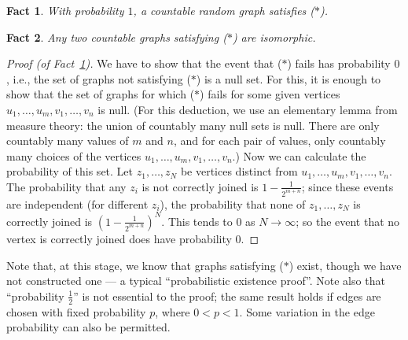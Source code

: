 \documentclass[12pt]{article}
\newtheorem{fact}{Fact}
\begin{document}
\begin{fact}\label{ch32:subsec2.1.1}
With probability $1$, a countable random graph satisfies ($\ast$).
\end{fact}

\begin{fact}\label{ch32:subsec2.1.2} 
Any two countable graphs satisfying ($\ast$) are isomorphic.
\end{fact}

\begin{proof}[Proof (of Fact~\ref{ch32:subsec2.1.1})]
We have to show
that the event that ($\ast$) fails has probability $0$, i.e., the set
of graphs not satisfying ($\ast$) is a null set. For this, it is
enough to show that the set of graphs for which ($\ast$) fails for
some given vertices $u_1, \ldots, u_m, v_1, \ldots, v_n$ is null.
(For this deduction, we use an elementary lemma from measure theory:
the union of countably many null sets is null. There are only
countably many values of $m$ and $n$, and for each pair of values,
only countably many choices of the vertices $u_1, \ldots, u_m, v_1,
\ldots, v_n$.) Now we can calculate the probability of this set.
Let $z_1,\ldots,z_N$ be vertices distinct from $u_1, \ldots, u_m,
v_1, \ldots, v_n$. The probability that any $z_i$ is not correctly
joined is $1- \frac{1}{2^{m+n}}$; since these events are independent
(for different $z_i$), the probability that none of $z_1,\ldots,z_N$
is correctly joined is $(1 - \frac{1}{2^{m+n}})^N$. This tends to $0$
as $N \rightarrow \infty$; so the event that no vertex is correctly
joined does have probability $0$.
\end{proof}

Note that, at this stage, we know that graphs satisfying ($\ast$)
exist, though we have not constructed one --- a typical
``probabilistic existence proof''. Note also that ``probability
$\frac{1}{2}$'' is not essential to the proof; the same result holds
if edges are chosen with fixed probability $p$, where $0 < p < 1$.
Some variation in the edge probability can also be permitted.
\end{document}
